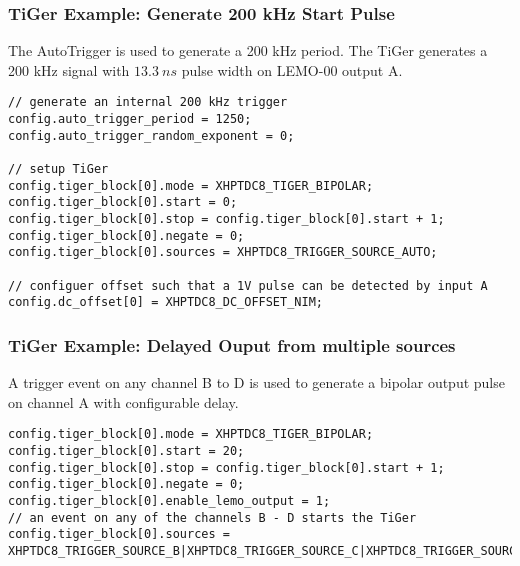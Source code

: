 \subsubsection{TiGer Example: Generate 200 kHz Start Pulse}
The AutoTrigger is used to generate a 200 kHz period. The TiGer generates a 200 kHz signal with $13.3 ~ns$ pulse width on LEMO-00 output A.
\begin{lstlisting}[frame=tlrb]
// generate an internal 200 kHz trigger
config.auto_trigger_period = 1250;
config.auto_trigger_random_exponent = 0;

// setup TiGer
config.tiger_block[0].mode = XHPTDC8_TIGER_BIPOLAR;
config.tiger_block[0].start = 0;
config.tiger_block[0].stop = config.tiger_block[0].start + 1;
config.tiger_block[0].negate = 0;
config.tiger_block[0].sources = XHPTDC8_TRIGGER_SOURCE_AUTO;

// configuer offset such that a 1V pulse can be detected by input A 
config.dc_offset[0] = XHPTDC8_DC_OFFSET_NIM; 
\end{lstlisting}

\subsubsection{TiGer Example: Delayed Ouput from multiple sources}
A trigger event on any channel B to D is used to generate a bipolar output pulse on channel A with configurable delay. 
\begin{lstlisting}[frame=tlrb]
config.tiger_block[0].mode = XHPTDC8_TIGER_BIPOLAR;
config.tiger_block[0].start = 20;
config.tiger_block[0].stop = config.tiger_block[0].start + 1;
config.tiger_block[0].negate = 0;
config.tiger_block[0].enable_lemo_output = 1;
// an event on any of the channels B - D starts the TiGer 
config.tiger_block[0].sources = XHPTDC8_TRIGGER_SOURCE_B|XHPTDC8_TRIGGER_SOURCE_C|XHPTDC8_TRIGGER_SOURCE_D;
\end{lstlisting}
